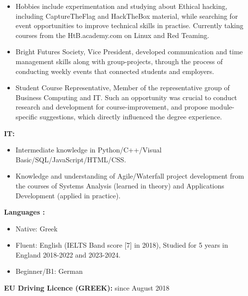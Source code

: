 \begin{itemize}
    \item Hobbies include experimentation and studying about Ethical hacking, including CaptureTheFlag and HackTheBox material, while searching for event opportunities to improve technical skills in practise. Currently taking courses from the HtB.academy.com on Linux and Red Teaming.
    \item Bright Futures Society, Vice President, developed communication and time management skills along with group-projects, through the process of conducting weekly events that connected students and employers.
    \item Student Course Representative, Member of the representative group of Business Computing and IT. Such an opportunity was crucial to conduct research and development for course-improvement, and propose module-specific suggestions, which directly influenced the degree experience.

\end{itemize}




\textbf{IT: }
\begin{itemize}
    \item Intermediate knowledge in Python/C++/Visual Basic/SQL/JavaScript/HTML/CSS.
    \item Knowledge and understanding of Agile/Waterfall project development from the courses of Systems Analysis (learned in theory) and Applications Development (applied in practice).
\end{itemize}

\textbf{Languages :}
\begin{itemize}
    \item Native: Greek
    \item Fluent: English (IELTS Band score [7] in 2018), Studied for 5 years in England 2018-2022 and 2023-2024.
    \item Beginner/B1: German
\end{itemize}

\textbf{EU Driving Licence (GREEK):} since August 2018
